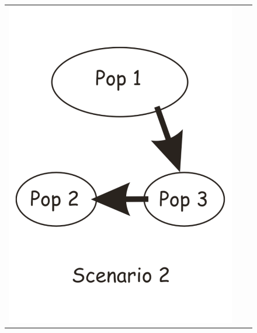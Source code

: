 \begin{figure}[h]
\begin{center}
\begin{tabular}{ccc}
\includegraphics[scale=0.2]{scenario_invasion_2.pdf} &

\end{tabular}
\end{center}
\end{figure}

